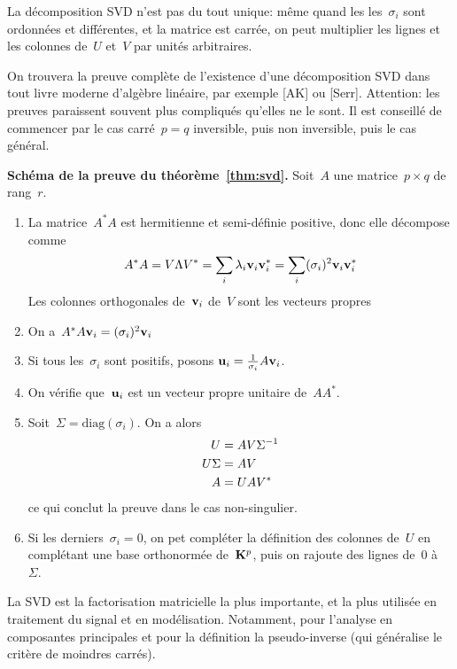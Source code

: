 \begin{remark}
	La décomposition SVD n'est pas du tout unique: même quand les
	les~$\sigma_i$ sont ordonnées et différentes, et la matrice est carrée, on
	peut multiplier les lignes et les colonnes de~$U$ et~$V$ par unités
	arbitraires.
\end{remark}

On trouvera la preuve complète de l'existence d'une décomposition SVD dans
tout livre moderne d'algèbre linéaire, par exemple [AK] ou [Serr].
Attention: les preuves paraissent souvent plus compliqués qu'elles ne le
sont.  Il est conseillé de commencer par le cas carré~$p=q$ inversible, puis
non inversible, puis le cas général.

{\bf Schéma de la preuve du théorème~\ref{thm:svd}.}
Soit~$A$ une matrice~$p\times q$ de rang~$r$.
\begin{enumerate}
	\item La matrice~$A^*A$ est hermitienne et semi-définie positive, donc elle
		décompose comme
		\[
		A^*A=V\Lambda V^*
		=\sum_i\lambda_i\mathbf{v}_i\mathbf{v}_i^*
		=\sum_i(\sigma_i)^2\mathbf{v}_i\mathbf{v}_i^*
		\]
	Les colonnes orthogonales de~$\mathbf{v}_i$ de~$V$ sont les vecteurs propres
	\item On a~$A^*A\mathbf{v}_i=(\sigma_i)^2\mathbf{v}_i$
	\item Si tous les~$\sigma_i$ sont positifs, posons
		$\mathbf{u}_i=\tfrac1{\sigma_i}A\mathbf{v}_i$.
	\item On vérifie que~$\mathbf{u}_i$ est un vecteur propre unitaire de~$AA^*$.
	\item Soit~$\Sigma=\mathrm{diag}(\sigma_i)$.  On a alors
		\begin{align*}
			U & =A V\Sigma^{-1} \\
			U\/\Sigma & =A V \\
			A & =U\/A V^* \\
		\end{align*}
		ce qui conclut la preuve dans le cas non-singulier.
	\item Si les derniers~$\sigma_i=0$, on pet compléter la définition des
		colonnes de~$U$ en complétant une base orthonormée de~$\mathbf{K}^p$, puis on
		rajoute des lignes de~$0$ à~$\Sigma$.
\end{enumerate}

\bigskip

La SVD est la factorisation matricielle la plus importante, et la plus
utilisée en traitement du signal et en modélisation.  Notamment, pour
l'analyse en composantes principales et pour la définition la pseudo-inverse
(qui généralise le critère de moindres carrés).

